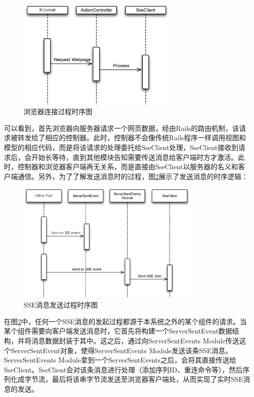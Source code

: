 \begin{figure}[h]
\centering
\includegraphics[width=0.7\textwidth]{images/overview/sse_module_timing1.eps}
\caption{浏览器连接过程时序图}
\label{fig-sse-module-timing1}
\end{figure}

可以看到，首先浏览器向服务器请求一个网页数据，经由Rails的路由机制，该请求被转发给了相应的控制器。此时，控制器不会像传统Rails程序一样调用视图和模型的相应代码，而是将该请求的处理委托给SseClient处理，SseClient接收到请求后，会开始长等待，直到其他模块告知需要传送消息给客户端时方才激活。此时，控制器和浏览器客户端再无关系，而是直接由SseClient以服务器的名义和客户端通信。另外，为了了解发送消息时的过程，图\ref{fig-sse-module-timing2}展示了发送消息的时序逻辑：

\begin{figure}[h]
\centering
\includegraphics[width=0.8\textwidth]{images/overview/sse_module_timing2.eps}
\caption{SSE消息发送过程时序图}
\label{fig-sse-module-timing2}
\end{figure}

在图\ref{fig-sse-module-timing2}中，任何一个SSE消息的发起过程都源于本系统之外的某个组件的请求。当某个组件需要向客户端发送消息时，它首先将构建一个ServerSentEvent数据结构，并将消息数据封装于其中。这之后，通过向ServerSentEvents Module传送这个ServerSentEvent对象，使得ServerSentEvents Module发送该条SSE消息。ServerSentEvents Module拿到一个ServerSentEvents之后，会将其直接传送给SseClient。SseClient会对该条消息进行处理（添加序列ID、重连命令等），然后序列化成字节流，最后将该串字节流发送至浏览器客户端处，从而实现了实时SSE消息的发送。


